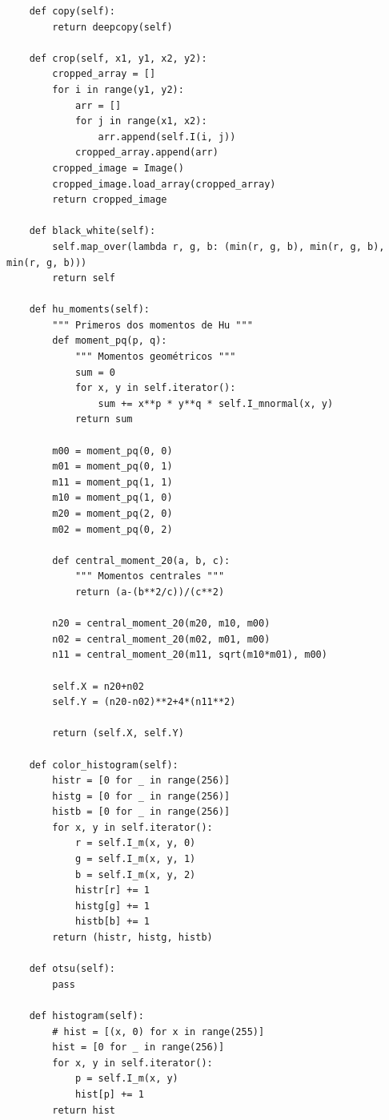 \documentclass[letter]{article}
\begin{document}
\begin{verbatim}
    def copy(self):
        return deepcopy(self)

    def crop(self, x1, y1, x2, y2):
        cropped_array = []
        for i in range(y1, y2):
            arr = []
            for j in range(x1, x2):
                arr.append(self.I(i, j))
            cropped_array.append(arr)
        cropped_image = Image()
        cropped_image.load_array(cropped_array)
        return cropped_image

    def black_white(self):
        self.map_over(lambda r, g, b: (min(r, g, b), min(r, g, b), min(r, g, b)))
        return self

    def hu_moments(self):
        """ Primeros dos momentos de Hu """
        def moment_pq(p, q):
            """ Momentos geométricos """
            sum = 0
            for x, y in self.iterator():
                sum += x**p * y**q * self.I_mnormal(x, y)
            return sum

        m00 = moment_pq(0, 0)
        m01 = moment_pq(0, 1)
        m11 = moment_pq(1, 1)
        m10 = moment_pq(1, 0)
        m20 = moment_pq(2, 0)
        m02 = moment_pq(0, 2)

        def central_moment_20(a, b, c):
            """ Momentos centrales """
            return (a-(b**2/c))/(c**2)

        n20 = central_moment_20(m20, m10, m00)
        n02 = central_moment_20(m02, m01, m00)
        n11 = central_moment_20(m11, sqrt(m10*m01), m00)

        self.X = n20+n02
        self.Y = (n20-n02)**2+4*(n11**2)

        return (self.X, self.Y)

    def color_histogram(self):
        histr = [0 for _ in range(256)]
        histg = [0 for _ in range(256)]
        histb = [0 for _ in range(256)]
        for x, y in self.iterator():
            r = self.I_m(x, y, 0)
            g = self.I_m(x, y, 1)
            b = self.I_m(x, y, 2)
            histr[r] += 1
            histg[g] += 1
            histb[b] += 1
        return (histr, histg, histb)

    def otsu(self):
        pass

    def histogram(self):
        # hist = [(x, 0) for x in range(255)]
        hist = [0 for _ in range(256)]
        for x, y in self.iterator():
            p = self.I_m(x, y)
            hist[p] += 1
        return hist


\end{verbatim}
\end{document}
